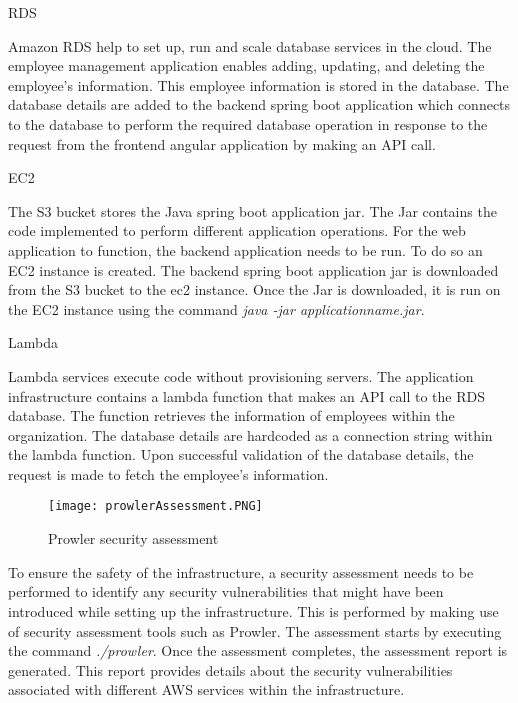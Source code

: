 \hfill \break

\par RDS

\par Amazon RDS help to set up, run and scale database services in the cloud.
The employee management application enables adding, updating, and deleting the employee’s information.
This employee information is stored in the database.
The database details are added to the backend spring boot application which connects to the database to perform the required database operation in response to the request from the frontend angular application by making an API call.

\hfill \break
\par EC2

\par The S3 bucket stores the Java spring boot application jar.
The Jar contains the code implemented to perform different application operations.
For the web application to function, the backend application needs to be run.
To do so an EC2 instance is created.
The backend spring boot application jar is downloaded from the S3 bucket to the ec2 instance.
Once the Jar is downloaded, it is run on the EC2 instance using the command \textit{java -jar applicationname.jar}.

\hfill \break
\par Lambda

\par Lambda services execute code without provisioning servers.
The application infrastructure contains a lambda function that makes an API call to the RDS database.
The function retrieves the information of employees within the organization.
The database details are hardcoded as a connection string within the lambda function.
Upon successful validation of the database details, the request is made to fetch the employee’s information.
\begin{figure}
    \centering
    \texttt{[image: prowlerAssessment.PNG]}
    \caption{Prowler security assessment}
    \label{fig:prowlerassessmentreport}
\end{figure}
\par To ensure the safety of the infrastructure, a security assessment needs to be performed to identify any security vulnerabilities that might have been introduced while setting up the infrastructure. This is performed by making use of security assessment tools such as Prowler. The assessment starts by executing the command \textit{./prowler}. Once the assessment completes, the assessment report is generated. This report provides details about the security vulnerabilities associated with different AWS services within the infrastructure.

